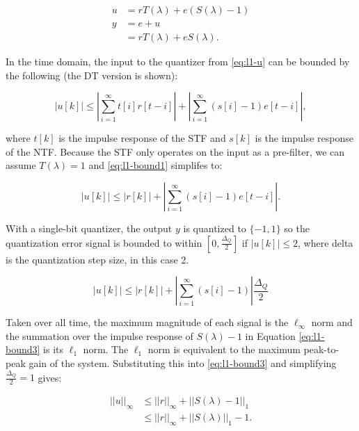 \begin{align}
	u &= rT(\lambda) + e\left(S(\lambda) - 1\right) \label{eq:l1-u} \\
	y &= e + u \nonumber \\
	&= rT(\lambda) + eS(\lambda). \nonumber
\end{align}

In the time domain, the input to the quantizer from \autoref{eq:l1-u} can be bounded by the following (the \gls{DT} version is shown):

\begin{equation}
	\left|u[k]\right| \leq \left|\sum_{i=1}^{\infty} t[i]r[t - i]\right| + \left|\sum_{i=1}^{\infty} \left(s[i] - 1\right)e[t - i]\right|, \label{eq:l1-bound1}
\end{equation}

where $t[k]$ is the impulse response of the \gls{STF} and $s[k]$ is the impulse response of the \gls{NTF}. Because the \gls{STF} only operates on the input as a pre-filter, we can assume $T(\lambda) = 1$ and \autoref{eq:l1-bound1} simplifes to:

\begin{equation}
	\left|u[k]\right| \leq |r[k]| + \left|\sum_{i=1}^{\infty} \left(s[i] - 1\right)e[t - i]\right|. \label{eq:l1-bound2}
\end{equation}

With a single-bit quantizer, the output $y$ is quantized to $\{-1, 1\}$ so the quantization error signal is bounded to within $[0, \frac{\Delta_Q}{2}]$ if $|u[k]| \leq 2$, where \gls{delta} is the quantization step size, in this case 2.

\begin{equation} 
	\left|u[k]\right| \leq |r[k]| + \left|\sum_{i=1}^{\infty} \left(s[i] - 1\right)\right|\frac{\Delta_Q}{2} \label{eq:l1-bound3}
\end{equation}

Taken over all time, the maximum magnitude of each signal is the $\ell_\infty$ norm and the summation over the impulse response of $S(\lambda) - 1$ in Equation \ref{eq:l1-bound3} is its $\ell_1$ norm. The $\ell_1$ norm is equivalent to the maximum peak-to-peak gain of the system. Substituting this into \autoref{eq:l1-bound3} and simplifying $\frac{\Delta_Q}{2} = 1$ gives:

\begin{align*}
	||u||_\infty &\leq ||r||_\infty + ||S(\lambda) - 1||_1 \\
	&\leq ||r||_\infty + ||S(\lambda)||_1 - 1	.
\end{align*}

